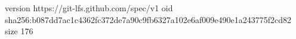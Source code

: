 version https://git-lfs.github.com/spec/v1
oid sha256:b087dd7ac1c4362fc372de7a90c9fb6327a102e6af009e490e1a243775f2cd82
size 176
